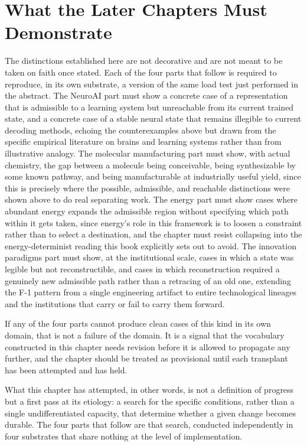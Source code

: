 \documentclass[11pt]{book}
\begin{document}
\section{What the Later Chapters Must Demonstrate}

The distinctions established here are not decorative and are not meant to be taken on faith once stated. Each of the four parts that follow is required to reproduce, in its own substrate, a version of the same load test just performed in the abstract. The NeuroAI part must show a concrete case of a representation that is admissible to a learning system but unreachable from its current trained state, and a concrete case of a stable neural state that remains illegible to current decoding methods, echoing the counterexamples above but drawn from the specific empirical literature on brains and learning systems rather than from illustrative analogy. The molecular manufacturing part must show, with actual chemistry, the gap between a molecule being conceivable, being synthesizable by some known pathway, and being manufacturable at industrially useful yield, since this is precisely where the possible, admissible, and reachable distinctions were shown above to do real separating work. The energy part must show cases where abundant energy expands the admissible region without specifying which path within it gets taken, since energy's role in this framework is to loosen a constraint rather than to select a destination, and the chapter must resist collapsing into the energy-determinist reading this book explicitly sets out to avoid. The innovation paradigms part must show, at the institutional scale, cases in which a state was legible but not reconstructible, and cases in which reconstruction required a genuinely new admissible path rather than a retracing of an old one, extending the F-1 pattern from a single engineering artifact to entire technological lineages and the institutions that carry or fail to carry them forward.

If any of the four parts cannot produce clean cases of this kind in its own domain, that is not a failure of the domain. It is a signal that the vocabulary constructed in this chapter needs revision before it is allowed to propagate any further, and the chapter should be treated as provisional until each transplant has been attempted and has held.

What this chapter has attempted, in other words, is not a definition of progress but a first pass at its etiology: a search for the specific conditions, rather than a single undifferentiated capacity, that determine whether a given change becomes durable. The four parts that follow are that search, conducted independently in four substrates that share nothing at the level of implementation.
\end{document}
